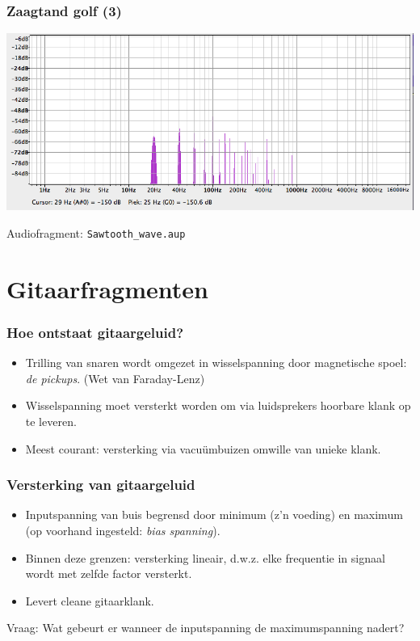 \documentclass[compress, darktitle, framenumber]{beamer}
\begin{document}
\begin{frame}
\frametitle{Zaagtand golf (3)}
\includegraphics[width=\textwidth]{images/Sawtooth_wave.png}
\begin{block}{Audiofragment:}
\texttt{Sawtooth\_wave.aup}
\end{block}
\end{frame}

\section{Gitaarfragmenten}

\begin{frame}
\frametitle{Hoe ontstaat gitaargeluid?}
\begin{itemize}
\item Trilling van snaren wordt omgezet in wisselspanning door magnetische spoel: \textit{de pickups}. (Wet van Faraday-Lenz)
\item Wisselspanning moet versterkt worden om via luidsprekers hoorbare klank op te leveren. 
\item Meest courant: versterking via vacu\"umbuizen omwille van unieke klank.
\end{itemize}
\end{frame}

\begin{frame}
\frametitle{Versterking van gitaargeluid}
\begin{itemize}
\item Inputspanning van buis begrensd door minimum (z'n voeding) en maximum (op voorhand ingesteld: \textit{bias spanning}).
\item Binnen deze grenzen: versterking lineair, d.w.z. elke frequentie in signaal wordt met zelfde factor versterkt.
\item Levert cleane gitaarklank. 
\end{itemize}
\begin{alertblock}{Vraag:}
Wat gebeurt er wanneer de inputspanning de maximumspanning nadert?
\end{alertblock}
\end{frame}
\end{document}
